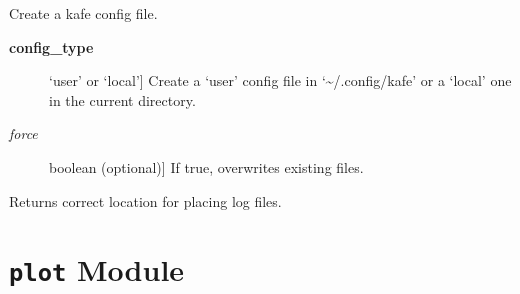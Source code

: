 \documentclass[a4paper,10pt,english]{sphinxmanual}
\begin{document}
\begin{fulllineitems}
\label{index:kafe.config.create_config_file}
Create a kafe config file.
\begin{description}
\item[{\textbf{config\_type}}] \leavevmode{[}`user' or `local'{]}
Create a `user' config file in `\textasciitilde{}/.config/kafe' or a
`local' one in the current directory.

\item[{\emph{force}}] \leavevmode{[}boolean (optional){]}
If true, overwrites existing files.

\end{description}

\end{fulllineitems}


\begin{fulllineitems}
\label{index:kafe.config.log_file}
Returns correct location for placing log files.

\end{fulllineitems}



\section{\texttt{plot} Module}
\label{index:module-kafe.plot}\label{index:plot-module}\label{index:module-plot}
\end{document}
